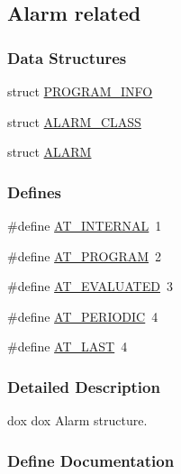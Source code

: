 \subsection{Alarm related}
\label{group__malarmh}
\subsubsection*{Data Structures}
\begin{DoxyCompactItemize}
\item 
struct \hyperlink{structPROGRAM__INFO}{PROGRAM\_\-INFO}
\item 
struct \hyperlink{structALARM__CLASS}{ALARM\_\-CLASS}
\item 
struct \hyperlink{structALARM}{ALARM}
\end{DoxyCompactItemize}
\subsubsection*{Defines}
\begin{DoxyCompactItemize}
\item 
\#define \hyperlink{group__malarmh_ga0aecd2654d62ebd6b3d8d57ef8ccf2d9}{AT\_\-INTERNAL}~1
\item 
\#define \hyperlink{group__malarmh_ga258ba8c74f1f017cc80ef51fa82e3e13}{AT\_\-PROGRAM}~2
\item 
\#define \hyperlink{group__malarmh_gabd367ea3feeb6b3fe27aaf45e9a067f6}{AT\_\-EVALUATED}~3
\item 
\#define \hyperlink{group__malarmh_ga40d5f5ba688496ddaa6f12e9a9b9f956}{AT\_\-PERIODIC}~4
\item 
\#define \hyperlink{group__malarmh_ga5f102004d1642b0878502f7a6a05fdfa}{AT\_\-LAST}~4
\end{DoxyCompactItemize}


\subsubsection{Detailed Description}
dox dox Alarm structure. 

\subsubsection{Define Documentation}
